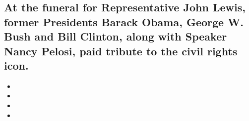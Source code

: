 \hypertarget{at-the-funeral-for-representative-john-lewis-former-presidents-barack-obama-george-w-bush-and-bill-clinton-along-with-speaker-nancy-pelosi-paid-tribute-to-the-civil-rights-icon-1}{%
\subsection{At the funeral for Representative John Lewis, former
Presidents Barack Obama, George W. Bush and Bill Clinton, along with
Speaker Nancy Pelosi, paid tribute to the civil rights
icon.}\label{at-the-funeral-for-representative-john-lewis-former-presidents-barack-obama-george-w-bush-and-bill-clinton-along-with-speaker-nancy-pelosi-paid-tribute-to-the-civil-rights-icon-1}}

\begin{itemize}
\item
\item
\item
\item
\end{itemize}

